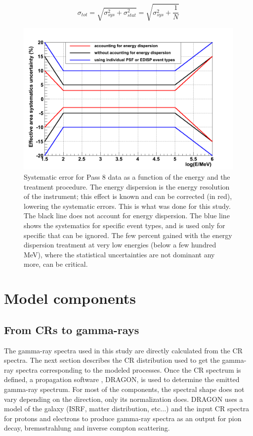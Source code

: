 \begin{equation}
\sigma_{tot} =\sqrt{\sigma_{sys}^2 + \sigma_{stat}^2} = \sqrt{\sigma_{sys}^2 + \frac{1}{N}}
\end{equation}


\begin{figure}[h]
 \centering
 \includegraphics[width=.6\linewidth]{pic/method/LAT_sys_error.png}
 \caption[Systematic errors for the Fermi LAT]{Systematic error for Pass 8 data as a function of the energy and the treatment procedure. The energy dispersion is the energy resolution of the instrument; this effect is known and can be corrected (in red), lowering the systematic errors. This is what was done for this study. The black line does not account for energy dispersion. The blue line shows the systematics for specific event types, and is used only for specific that can be ignored. The few percent gained with the energy dispersion treatment at very low energies (below a few hundred MeV), where the statistical uncertainties are not dominant any more, can be critical.}
 \label{fig:LAT_sys_err}
\end{figure}




\newpage
\section{Model components}
\subsection{From CRs to gamma-rays}

The gamma-ray spectra used in this study are directly calculated from the CR spectra. The next section describes the CR distribution used to get the gamma-ray spectra corresponding to the modeled processes. Once the CR spectrum is defined, a propagation software \cite{Evoli2008}, DRAGON, is used to determine the emitted gamma-ray spectrum. For most of the components, the spectral shape does not vary depending on the direction, only its normalization does.%
DRAGON uses a model of the galaxy (ISRF, matter distribution, etc...) and the input CR spectra for protons and electrons to produce gamma-ray spectra as an output for pion decay, bremsstrahlung and inverse compton scattering.


